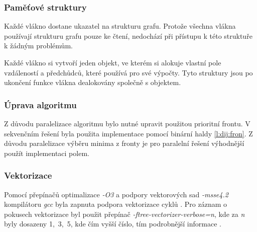 \subsubsection{Paměťové struktury}
Každé vlákno dostane ukazatel na strukturu grafu. Protože všechna vlákna používají strukturu grafu pouze ke čtení, nedochází při přístupu k této struktuře k žádným problémům.

Každé vlákno si vytvoří jeden objekt, ve kterém si alokuje vlastní pole vzdáleností a předchůdců, které používá pro své výpočty. Tyto struktury jsou po ukončení funkce vlákna dealokovány společně s objektem.

\subsubsection{Úprava algoritmu}
Z důvodu paralelizace algoritmu bylo nutné upravit použitou prioritní frontu. V sekvenčním řešení byla použita implementace pomocí binární haldy \ref{l:dij:fron}. Z důvodu paralelizace výběru minima z fronty je pro paralelní řešení výhodnější použít implementaci polem.


\subsubsection{Vektorizace}
Pomocí přepínačů optimalizace \textit{-O3} a podpory vektorových sad \textit{-msse4.2} kompilátoru \textit{gcc} byla zapnuta podpora vektorizace cyklů \cite{w:vect}. Pro záznam o pokusech vektorizace byl použit přepínač \textit{-ftree-vectorizer-verbose=n}, kde za \textit{n} byly dosazeny 1,~3,~5, kde čím vyšší číslo, tím podrobnější informace \cite{w:vect}.\textbf{}


